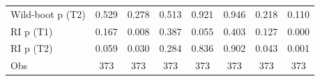{\begin{tabular}{l*{7}{c}}
Wild-boot p (T2)    &       0.529         &       0.278         &       0.513         &       0.921         &       0.946         &       0.218         &       0.110         \\
RI p (T1)           &       0.167         &       0.008         &       0.387         &       0.055         &       0.403         &       0.127         &       0.000         \\
RI p (T2)           &       0.059         &       0.030         &       0.284         &       0.836         &       0.902         &       0.043         &       0.001         \\
Obs                 &         373         &         373         &         373         &         373         &         373         &         373         &         373         \\
\bottomrule
\end{tabular}
}
